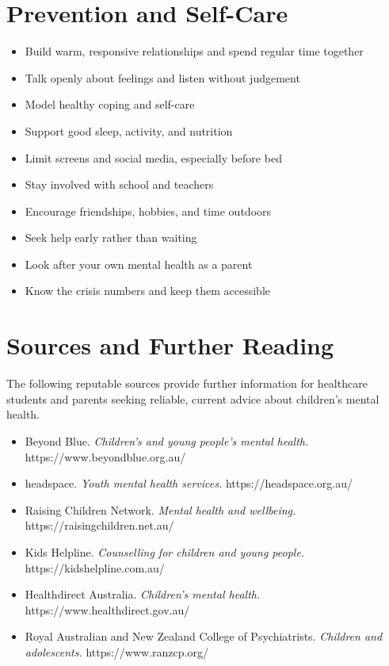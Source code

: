 \section*{Prevention and Self-Care}
\begin{itemize}
    \item Build warm, responsive relationships and spend regular time together
    \item Talk openly about feelings and listen without judgement
    \item Model healthy coping and self-care
    \item Support good sleep, activity, and nutrition
    \item Limit screens and social media, especially before bed
    \item Stay involved with school and teachers
    \item Encourage friendships, hobbies, and time outdoors
    \item Seek help early rather than waiting
    \item Look after your own mental health as a parent
    \item Know the crisis numbers and keep them accessible
\end{itemize}

\section*{Sources and Further Reading}
The following reputable sources provide further information for healthcare students and parents seeking reliable, current advice about children's mental health.
\begin{itemize}
    \item Beyond Blue. \textit{Children's and young people's mental health.} https://www.beyondblue.org.au/
    \item headspace. \textit{Youth mental health services.} https://headspace.org.au/
    \item Raising Children Network. \textit{Mental health and wellbeing.} https://raisingchildren.net.au/
    \item Kids Helpline. \textit{Counselling for children and young people.} https://kidshelpline.com.au/
    \item Healthdirect Australia. \textit{Children's mental health.} https://www.healthdirect.gov.au/
    \item Royal Australian and New Zealand College of Psychiatrists. \textit{Children and adolescents.} https://www.ranzcp.org/
\end{itemize}
